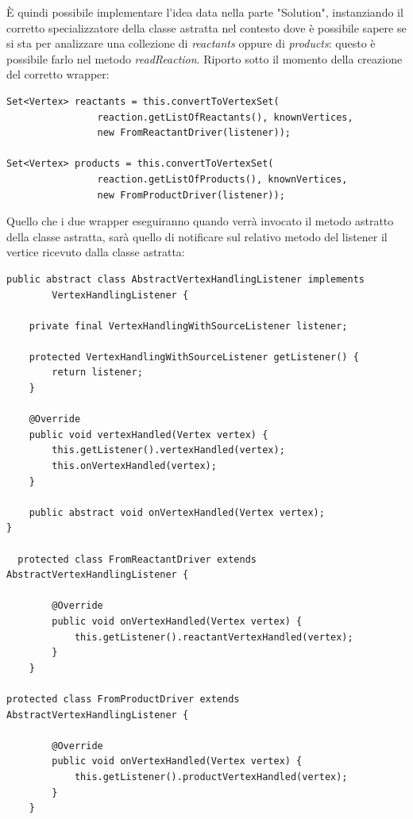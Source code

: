 \`E quindi possibile implementare l'idea data nella parte "Solution",
instanziando il corretto specializzatore della classe astratta nel
contesto dove \`e possibile sapere se si sta per analizzare una
collezione di \emph{reactants} oppure di \emph{products}: questo \`e
possibile farlo nel metodo \emph{readReaction}. Riporto sotto il
momento della creazione del corretto wrapper:
\begin{lstlisting}
Set<Vertex> reactants = this.convertToVertexSet(
				reaction.getListOfReactants(), knownVertices,
				new FromReactantDriver(listener));

Set<Vertex> products = this.convertToVertexSet(
				reaction.getListOfProducts(), knownVertices,
				new FromProductDriver(listener));
                              \end{lstlisting}
Quello che i due wrapper eseguiranno quando verr\`a invocato il metodo
astratto della classe astratta, sar\`a quello di notificare sul
relativo metodo del listener il vertice ricevuto dalla classe
astratta:
\begin{lstlisting}
public abstract class AbstractVertexHandlingListener implements
		VertexHandlingListener {

	private final VertexHandlingWithSourceListener listener;

	protected VertexHandlingWithSourceListener getListener() {
		return listener;
	}

	@Override
	public void vertexHandled(Vertex vertex) {
		this.getListener().vertexHandled(vertex);
		this.onVertexHandled(vertex);
	}

	public abstract void onVertexHandled(Vertex vertex);
}

  protected class FromReactantDriver extends AbstractVertexHandlingListener {

		@Override
		public void onVertexHandled(Vertex vertex) {
			this.getListener().reactantVertexHandled(vertex);
		}
	}

protected class FromProductDriver extends AbstractVertexHandlingListener {

		@Override
		public void onVertexHandled(Vertex vertex) {
			this.getListener().productVertexHandled(vertex);
		}
	}
\end{lstlisting}